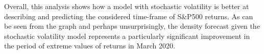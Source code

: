 \documentclass[
]{book}
\theoremstyle{break}
\theoremstyle{nonumberplain}
\begin{document}
Overall, this analysis shows how a model with stochastic volatility is
better at describing and predicting the considered time-frame of S\&P500
returns. As can be seen from the graph and perhaps unsurprisingly, the
density forecast given the stochastic volatility model represents a
particularly significant improvement in the period of extreme values of
returns in March 2020.

\backmatter
\end{document}
